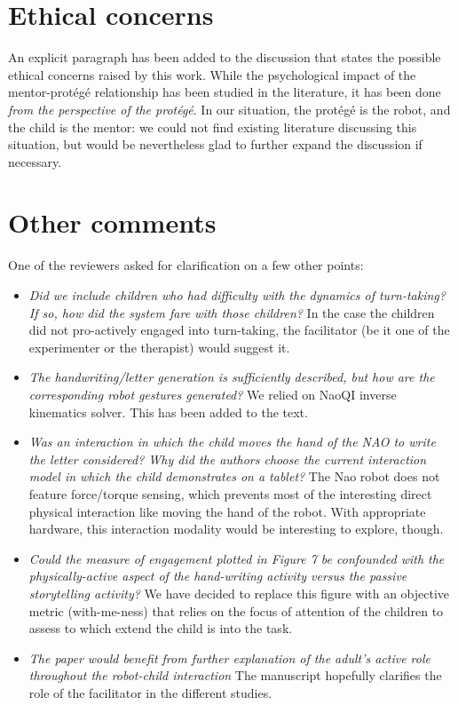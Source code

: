 \documentclass{article}
\begin{document}
\section*{Ethical concerns}

An explicit paragraph has been added to the discussion that states the possible
ethical concerns raised by this work. While the psychological impact of the
mentor-protégé relationship has been studied in the literature, it has been
done \emph{from the perspective of the protégé}. In our situation, the protégé
is the robot, and the child is the mentor: we could not find existing
literature discussing this situation, but would be nevertheless glad to further
expand the discussion if necessary.

\section*{Other comments}

One of the reviewers asked for clarification on a few other points:

\begin{itemize}

\item \emph{Did we include children who had difficulty with the dynamics of
turn-taking? If so, how did the system fare with those children?} In the case
the children did not pro-actively engaged into turn-taking, the facilitator (be
it one of the experimenter or the therapist) would suggest it.

\item \emph{The handwriting/letter generation is sufficiently described, but
how are the corresponding robot gestures generated?} We relied on NaoQI inverse
kinematics solver. This has been added to the text.

\item \emph{Was an interaction in which the child moves the hand of the NAO to
write the letter considered? Why did the authors choose the current interaction
model in which the child demonstrates on a tablet?} The Nao robot does not
feature force/torque sensing, which prevents most of the interesting direct
physical interaction like moving the hand of the robot. With appropriate
hardware, this interaction modality would be interesting to explore, though.

\item \emph{Could the measure of engagement plotted in Figure 7 be confounded
with the physically-active aspect of the hand-writing activity versus the
passive storytelling activity?} We have decided to replace this figure with an
objective metric (with-me-ness) that relies on the focus of attention of the
children to assess to which extend the child is into the task.

\item \emph{The paper would benefit from further explanation of the adult's
active role throughout the robot-child interaction} The manuscript hopefully
clarifies the role of the facilitator in the different studies.

\end{itemize}
\end{document}
